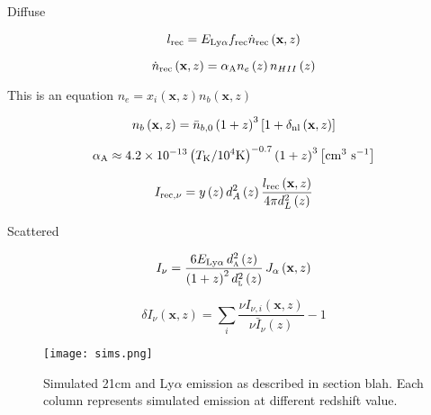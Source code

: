 Diffuse

\begin{equation}
  l_{\rm rec} = E_{\rm Ly\alpha} f_{\rm rec} \dot{n}_{\rm rec} \left( \textbf{x}, z \right)
\end{equation}

\begin{equation}
  \dot{n}_{\rm rec} \left( \textbf{x}, z \right) = \alpha_{\rm A} n_{e} \left(z \right) n_{HII} \left(z \right)
\end{equation}

This is an equation $n_{e} = x_i \left( \textbf{x}, z \right) n_{b} \left( \textbf{x}, z \right) $

\begin{equation}
  n_{b} \left( \textbf{x}, z \right) = \bar{n}_{b, 0} \left( 1 + z\right)^3 \left[1 + \delta_{\rm nl} \left( \textbf{x}, z\right) \right]
\end{equation}

\begin{equation}
  \alpha_{\rm A} \approx 4.2 \times 10^{-13} \left( T_{\rm K} / 10^4 {\rm K} \right)^{-0.7} \left( 1 + z\right)^3 \left[\rm  cm^3 \ s^{-1} \right]
\end{equation}

\begin{equation}
I_{\rm rec, \nu} = y \left(z \right) d_A^2 \left(z \right) \frac{l_{\rm rec} \left( \textbf{x}, z \right)}{4 \pi d_L^2 \left( z \right)}
\end{equation}

Scattered

\begin{equation}
  I_{\nu} = \frac{6 E_{\text{Ly}\alpha}\, d_\textsc{a}^2 \left(z \right)}{\left( 1 + z\right)^2 d_\textsc{l}^2 \left( z \right)}\, J_{\alpha} \left( \textbf{x}, z \right)
\end{equation}

\begin{equation}
  \delta I_{\nu} \left(\textbf{x}, z \right) = \sum_i \frac{\nu I_{\nu, i} \left(\textbf{x}, z \right)}{\nu \bar{I}_{\nu} \left(z \right)} - 1
\end{equation}

\begin{figure}[ht]
	\centering
	\texttt{[image: sims.png]}
	\caption[Simulated 21cm and Ly$\alpha$ emission]{Simulated 21cm and Ly$\alpha$ emission
	 as described in section blah. Each column represents simulated emission at different
	 redshift value.}
	\label{fig:sims}
\end{figure}
